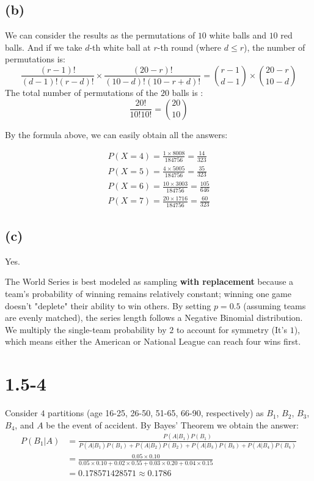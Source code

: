 \documentclass[12pt]{article}
\begin{document}
\subsection*{(b)}
We can consider the results as the permutations of $10$ white balls and $10$ red balls. And if we take $d$-th white ball at $r$-th round (where $d \le r$), the number of permutations is:
\[\frac{(r-1)!}{(d-1)!(r-d)!}\times\frac{(20-r)!}{(10-d)!(10-r+d)!}=\binom{r-1}{d-1}\times \binom{20-r}{10-d}\]
The total number of permutations of the $20$ balls is :
\[\frac{20!}{10!10!}=\binom{20}{10}\]

By the formula above, we can easily obtain all the answers:

\begin{align*}
P(X=4)=\frac{1\times 8008}{184756}=\frac{14}{323} \\    
P(X=5)=\frac{4\times 5005}{184756}=\frac{35}{323} \\
P(X=6)=\frac{10\times 3003}{184756}=\frac{105}{646} \\
P(X=7)=\frac{20\times 1716}{184756}=\frac{60}{323}
\end{align*}

\subsection*{(c)}
Yes.

The World Series is best modeled as sampling \textbf{with replacement} because a team’s probability of winning remains relatively constant; winning one game doesn't "deplete" their ability to win others. By setting $p = 0.5$ (assuming teams are evenly matched), the series length follows a Negative Binomial distribution. We multiply the single-team probability by $2$ to account for symmetry (It's $1$), which means either the American or National League can reach four wins first.
\section*{1.5-4}
Consider $4$ partitions (age 16-25, 26-50, 51-65, 66-90, respectively) as $B_1$, $B_2$, $B_3$, $B_4$, and $A$ be the event of accident. By Bayes' Theorem we obtain the answer:
\begin{align*}
    P(B_1|A) &= \frac{P(A|B_1)P(B_1)}{P(A|B_1)P(B_1)+P(A|B_2)P(B_2)+P(A|B_3)P(B_3)+P(A|B_4)P(B_4)} \\
    &= \frac{0.05\times 0.10}{0.05\times 0.10+0.02\times 0.55+0.03\times 0.20+0.04\times 0.15} \\
    &= 0.178571428571\approx 0.1786
\end{align*}
\end{document}
